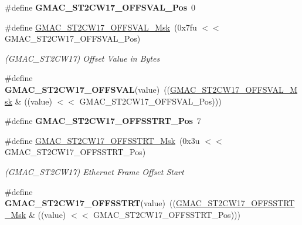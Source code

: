 \begin{DoxyCompactItemize}
\item 
\mbox{\label{group__SAME70__GMAC_gaa9d3c1e1d68cd3e32c318acb1d939f6d}} 
\#define {\bfseries G\+M\+A\+C\+\_\+\+S\+T2\+C\+W17\+\_\+\+O\+F\+F\+S\+V\+A\+L\+\_\+\+Pos}~0
\item 
\mbox{\label{group__SAME70__GMAC_ga97157436e4b56095515dca0135630967}} 
\#define \mbox{\hyperlink{group__SAME70__GMAC_ga97157436e4b56095515dca0135630967}{G\+M\+A\+C\+\_\+\+S\+T2\+C\+W17\+\_\+\+O\+F\+F\+S\+V\+A\+L\+\_\+\+Msk}}~(0x7fu $<$$<$ G\+M\+A\+C\+\_\+\+S\+T2\+C\+W17\+\_\+\+O\+F\+F\+S\+V\+A\+L\+\_\+\+Pos)
\begin{DoxyCompactList}\small\item\em (G\+M\+A\+C\+\_\+\+S\+T2\+C\+W17) Offset Value in Bytes \end{DoxyCompactList}\item 
\mbox{\label{group__SAME70__GMAC_ga6993c26320557a64367bf8addfe1a704}} 
\#define {\bfseries G\+M\+A\+C\+\_\+\+S\+T2\+C\+W17\+\_\+\+O\+F\+F\+S\+V\+AL}(value)~((\mbox{\hyperlink{group__SAMV71__GMAC_ga97157436e4b56095515dca0135630967}{G\+M\+A\+C\+\_\+\+S\+T2\+C\+W17\+\_\+\+O\+F\+F\+S\+V\+A\+L\+\_\+\+Msk}} \& ((value) $<$$<$ G\+M\+A\+C\+\_\+\+S\+T2\+C\+W17\+\_\+\+O\+F\+F\+S\+V\+A\+L\+\_\+\+Pos)))
\item 
\mbox{\label{group__SAME70__GMAC_ga3371955e2613807c9d42785e327a78d5}} 
\#define {\bfseries G\+M\+A\+C\+\_\+\+S\+T2\+C\+W17\+\_\+\+O\+F\+F\+S\+S\+T\+R\+T\+\_\+\+Pos}~7
\item 
\mbox{\label{group__SAME70__GMAC_ga23d094259c94b87abb7a505ace1f504e}} 
\#define \mbox{\hyperlink{group__SAME70__GMAC_ga23d094259c94b87abb7a505ace1f504e}{G\+M\+A\+C\+\_\+\+S\+T2\+C\+W17\+\_\+\+O\+F\+F\+S\+S\+T\+R\+T\+\_\+\+Msk}}~(0x3u $<$$<$ G\+M\+A\+C\+\_\+\+S\+T2\+C\+W17\+\_\+\+O\+F\+F\+S\+S\+T\+R\+T\+\_\+\+Pos)
\begin{DoxyCompactList}\small\item\em (G\+M\+A\+C\+\_\+\+S\+T2\+C\+W17) Ethernet Frame Offset Start \end{DoxyCompactList}\item 
\mbox{\label{group__SAME70__GMAC_ga0eb7f783e9dcb0a5ac0c2778c096eaa9}} 
\#define {\bfseries G\+M\+A\+C\+\_\+\+S\+T2\+C\+W17\+\_\+\+O\+F\+F\+S\+S\+T\+RT}(value)~((\mbox{\hyperlink{group__SAMV71__GMAC_ga23d094259c94b87abb7a505ace1f504e}{G\+M\+A\+C\+\_\+\+S\+T2\+C\+W17\+\_\+\+O\+F\+F\+S\+S\+T\+R\+T\+\_\+\+Msk}} \& ((value) $<$$<$ G\+M\+A\+C\+\_\+\+S\+T2\+C\+W17\+\_\+\+O\+F\+F\+S\+S\+T\+R\+T\+\_\+\+Pos)))

\end{DoxyCompactItemize}
